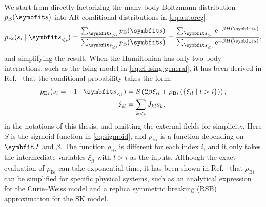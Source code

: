 We start from directly factorizing the many-body Boltzmann distribution $p_\text{B}(\vs)$ into AR conditional distributions in \cref{eq:autoreg}:
\begin{equation}
p_{\text{B} i}(s_i \mid \vs_{< i})
= \frac{\sum_{\vs_{> i}} p_\text{B}(\vs)}{\sum_{\vs_{\ge i}} p_\text{B}(\vs)}
= \frac{\sum_{\vs_{> i}} \rme^{-\beta H(\vs)}}{\sum_{\vs_{\ge i}} \rme^{-\beta H(\vs)}},
\end{equation}
and simplifying the result. When the Hamiltonian has only two-body interactions, such as the Ising model in \cref{eq:cl-ising-general}, it has been derived in Ref.~\cite{biazzo2024sparse} that the conditional probability takes the form:
\begin{align}
p_{\text{B} i}(s_i = +1 \mid \vs_{<i}) &= S\left( 2 \beta \xi_{i i} + \rho_{\text{B} i}\left( \{\xi_{i l} \mid l > i\} \right) \right), \label{eq:twobo} \\
\xi_{i l} &= \sum_{k < i} J_{k l} s_k, \label{eq:twobo-xi}
\end{align}
in the notations of this thesis, and omitting the external fields for simplicity. Here $S$ is the sigmoid function in \cref{eq:sigmoid}, and $\rho_{\text{B} i}$ is a function depending on $\mJ$ and $\beta$. The function $\rho_{\text{B} i}$ is different for each index $i$, and it only takes the intermediate variables $\xi_{i l}$ with $l > i$ as the inputs. Although the exact evaluation of $\rho_{\text{B} i}$ can take exponential time, it has been shown in Ref.~\cite{biazzo2023autoregressive} that $\rho_{\text{B} i}$ can be simplified for specific physical systems, such as an analytical expression for the Curie--Weiss model and a replica symmetric breaking (RSB) approximation for the SK model.

